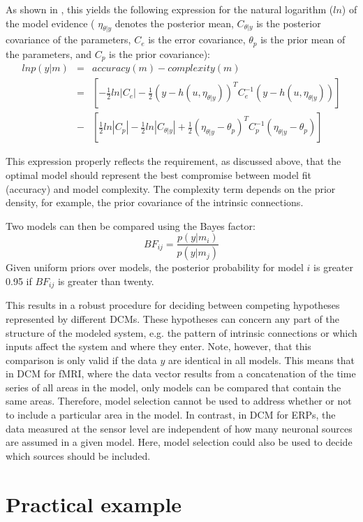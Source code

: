 As shown in \cite{cdcm}, this yields the following expression for the natural logarithm ($ln$) of the model evidence ( $\eta_{\theta | y}$ denotes the posterior mean, $C_{\theta | y}$ is the posterior covariance of the parameters, $C_e$  is the error covariance, $\theta_p$ is the prior mean of the parameters, and $C_p$ is the prior covariance):
\begin{eqnarray}
ln p(y|m) & = & accuracy(m) - complexity (m) \\ \nonumber
& = & \left[ -\frac{1}{2} ln |C_e| - \frac{1}{2} (y-h(u,\eta_{\theta | y}))^T C_e^{-1} (y-h(u,\eta_{\theta | y}))\right] \\ \nonumber
& - & \left[ \frac{1}{2} ln |C_p| -\frac{1}{2}ln |C_{\theta | y}| + \frac{1}{2} (\eta_{\theta | y}-\theta_p)^T C_p^{-1} (\eta_{\theta | y}-\theta_p) \right]
\end{eqnarray}

This expression properly reflects the requirement, as discussed above, that the optimal model should represent the best compromise between model fit (accuracy) and model complexity.  The complexity term depends on the prior density, for example, the prior covariance of the intrinsic connections.  

Two models can then be compared using the Bayes factor:
\begin{equation}
BF_{ij} = \frac{p(y|m_i)}{p(y|m_j)}
\end{equation}
Given uniform priors over models, the posterior probability for model $i$ is greater 0.95 if $BF_{ij}$ is greater than twenty.

This results in a robust procedure for deciding between competing hypotheses represented by different DCMs. These hypotheses can concern any part of the structure of the modeled system, e.g. the pattern of intrinsic connections or which inputs affect the system and where they enter. Note, however, that this comparison is only valid if the data $y$ are identical in all models.  This means that in DCM for fMRI, where the data vector results from a concatenation of the time series of all areas in the model, only models can be compared that contain the same areas. Therefore, model selection cannot be used to address whether or not to include a particular area in the model.  In contrast, in DCM for ERPs, the data measured at the sensor level are independent of how many neuronal sources are assumed in a given model.  Here, model selection could also be used to decide which sources should be included.

\section{Practical example}

